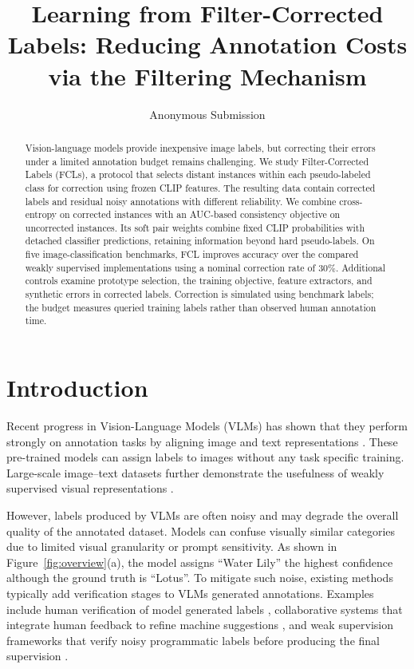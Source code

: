 \documentclass[10pt,twocolumn,letterpaper]{article}
\title{Learning from Filter-Corrected Labels: Reducing Annotation Costs via the Filtering Mechanism}
\author{
    Anonymous Submission
}
\begin{document}
\maketitle
%     
% 
% 
% 

\begin{abstract}
Vision-language models provide inexpensive image labels, but correcting their errors under a limited annotation budget remains challenging. We study Filter-Corrected Labels (FCLs), a protocol that selects distant instances within each pseudo-labeled class for correction using frozen CLIP features. The resulting data contain corrected labels and residual noisy annotations with different reliability. We combine cross-entropy on corrected instances with an AUC-based consistency objective on uncorrected instances. Its soft pair weights combine fixed CLIP probabilities with detached classifier predictions, retaining information beyond hard pseudo-labels. On five image-classification benchmarks, FCL improves accuracy over the compared weakly supervised implementations using a nominal correction rate of $30\%$. Additional controls examine prototype selection, the training objective, feature extractors, and synthetic errors in corrected labels. Correction is simulated using benchmark labels; the budget measures queried training labels rather than observed human annotation time.
\end{abstract}

\section{Introduction}\label{sec:intro}
Recent progress in Vision-Language Models (VLMs) has shown that they perform strongly on annotation tasks by aligning image and text representations \cite{radford2021clip}. These pre-trained models can assign labels to images without any task specific training. Large-scale image--text datasets further demonstrate the usefulness of weakly supervised visual representations \cite{gadre2023datacomp, schuhmann2022laion5b}.

However, labels produced by VLMs are often noisy and may degrade the overall quality of the annotated dataset. Models can confuse visually similar categories due to limited visual granularity or prompt sensitivity. As shown in Figure~\ref{fig:overview}(a), the model assigns ``Water Lily'' the highest confidence although the ground truth is ``Lotus''. To mitigate such noise, existing methods typically add verification stages to VLMs generated annotations. Examples include human verification of model generated labels \cite{wang2024humanllm}, collaborative systems that integrate human feedback to refine machine suggestions \cite{kim2024meganno}, and weak supervision frameworks that verify noisy programmatic labels before producing the final supervision \cite{ratner2017snorkel}.
\end{document}
